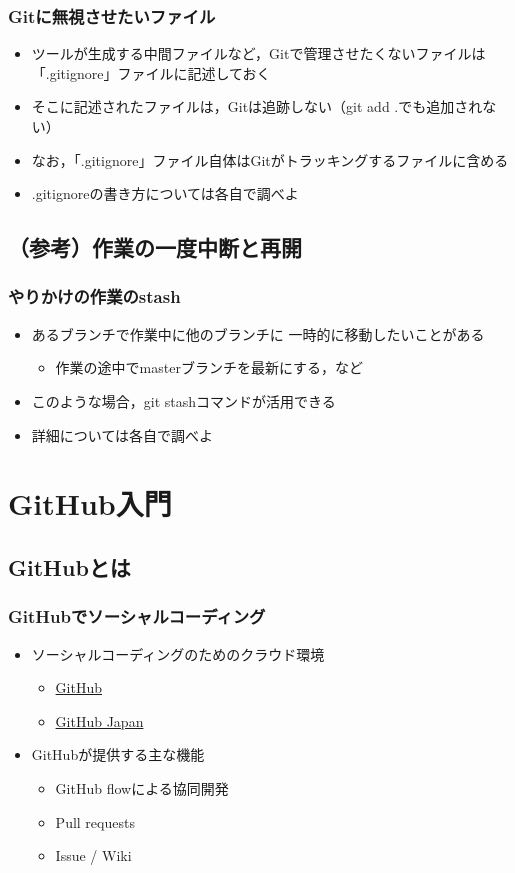 \documentclass[a4paper,twoside,twocolumn]{bxjsarticle}
\begin{document}
\subsubsection{Gitに無視させたいファイル}
\label{sec-1-8-2}
\begin{itemize}
\item ツールが生成する中間ファイルなど，Gitで管理させたくないファイルは
「.gitignore」ファイルに記述しておく
\item そこに記述されたファイルは，Gitは追跡しない（git add .でも追加されない）
\item なお，「.gitignore」ファイル自体はGitがトラッキングするファイルに含める
\item .gitignoreの書き方については各自で調べよ
\end{itemize}

\subsection{（参考）作業の一度中断と再開}
\label{sec-1-9}
\subsubsection{やりかけの作業のstash}
\label{sec-1-9-1}
\begin{itemize}
\item あるブランチで作業中に他のブランチに
一時的に移動したいことがある
\begin{itemize}
\item 作業の途中でmasterブランチを最新にする，など
\end{itemize}
\item このような場合，git stashコマンドが活用できる
\item 詳細については各自で調べよ
\end{itemize}
\section{GitHub入門}
\label{sec-2}
\subsection{GitHubとは}
\label{sec-2-1}
\subsubsection{GitHubでソーシャルコーディング}
\label{sec-2-1-1}
\begin{itemize}
\item ソーシャルコーディングのためのクラウド環境
\begin{itemize}
\item \href{https://github.com/}{GitHub}
\item \href{http://github.co.jp/}{GitHub Japan}
\end{itemize}
\item GitHubが提供する主な機能
\begin{itemize}
\item GitHub flowによる協同開発
\item Pull requests
\item Issue / Wiki
\end{itemize}
\end{itemize}
\end{document}
